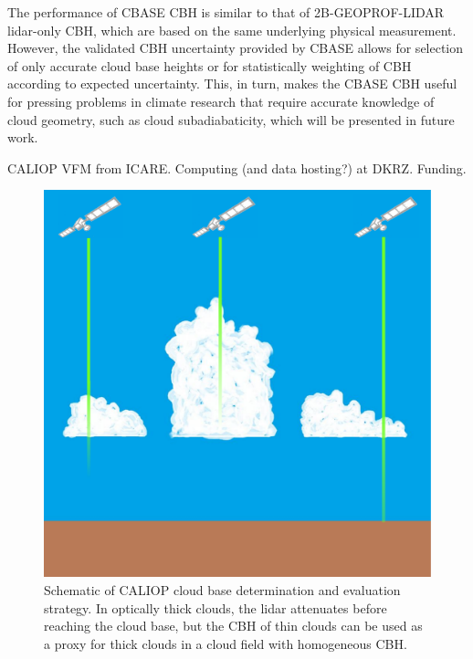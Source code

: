 \documentclass[essd,manuscript]{copernicus}\usepackage[]{graphicx}\usepackage[]{color}
\begin{document}
The performance of CBASE CBH is similar to that of
2B-GEOPROF-LIDAR lidar-only CBH, which are based on the same
underlying physical measurement.  However, the validated CBH
uncertainty provided by CBASE allows for selection of only accurate cloud base
heights or for statistically weighting of CBH according to 
expected uncertainty.  This, in turn, makes the CBASE CBH useful
for pressing problems in climate research that require accurate knowledge of
cloud geometry, such as cloud subadiabaticity, which will be presented in future
work. 

\begin{acknowledgements}
CALIOP VFM from ICARE.  Computing (and data hosting?) at DKRZ.  Funding.
\end{acknowledgements}


\begin{figure}
  \centering
  \includegraphics[width=0.5\linewidth,keepaspectratio=true]{CloudFieldCALIOP.pdf}
  \caption{Schematic of CALIOP cloud base determination and evaluation
    strategy.  In optically thick clouds, the lidar attenuates before reaching
    the cloud base, but the CBH of thin clouds can be used as a
    proxy for thick clouds in a cloud field with homogeneous CBH.}
  \label{fig:method}
\end{figure}
\end{document}
